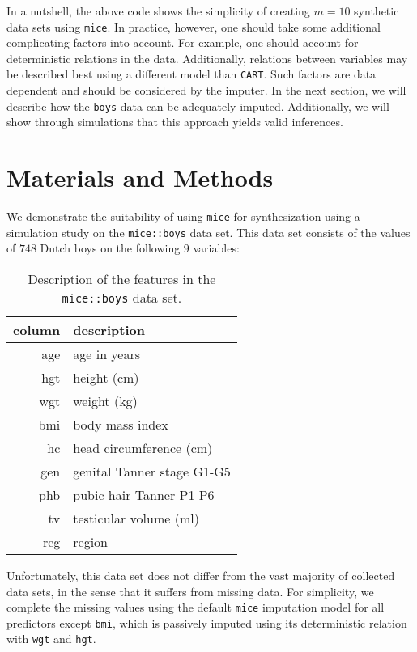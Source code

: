 \documentclass[psych,article,submit,moreauthors,pdftex]{mdpi}
\begin{document}
In a nutshell, the above code shows the simplicity of creating
\(m = 10\) synthetic data sets using \texttt{mice}. In practice,
however, one should take some additional complicating factors into
account. For example, one should account for deterministic relations in
the data. Additionally, relations between variables may be described
best using a different model than \texttt{CART}. Such factors are data
dependent and should be considered by the imputer. In the next section,
we will describe how the \texttt{boys} data can be adequately imputed.
Additionally, we will show through simulations that this approach yields
valid inferences.

\hypertarget{materials-and-methods}{%
\section{Materials and Methods}\label{materials-and-methods}}

We demonstrate the suitability of using \texttt{mice} for synthesization
using a simulation study on the \texttt{mice::boys} data set. This data
set consists of the values of \(748\) Dutch boys on the following \(9\)
variables:

\begin{table}[H]
\caption{Description of the features in the \texttt{mice::boys} data set.}
\centering
\begin{tabular}{rl}
\hline
column & description                \\ 
\hline
age    & age in years               \\ 
hgt    & height (cm)                \\ 
wgt    & weight (kg)                \\ 
bmi    & body mass index            \\ 
hc     & head circumference (cm)    \\ 
gen    & genital Tanner stage G1-G5 \\ 
phb    & pubic hair Tanner P1-P6    \\ 
tv     & testicular volume (ml)     \\ 
reg    & region                     \\ 
\hline
\end{tabular}
\end{table}

Unfortunately, this data set does not differ from the vast majority of
collected data sets, in the sense that it suffers from missing data. For
simplicity, we complete the missing values using the default
\texttt{mice} imputation model for all predictors except \texttt{bmi},
which is passively imputed using its deterministic relation with
\texttt{wgt} and \texttt{hgt}.
\end{document}
